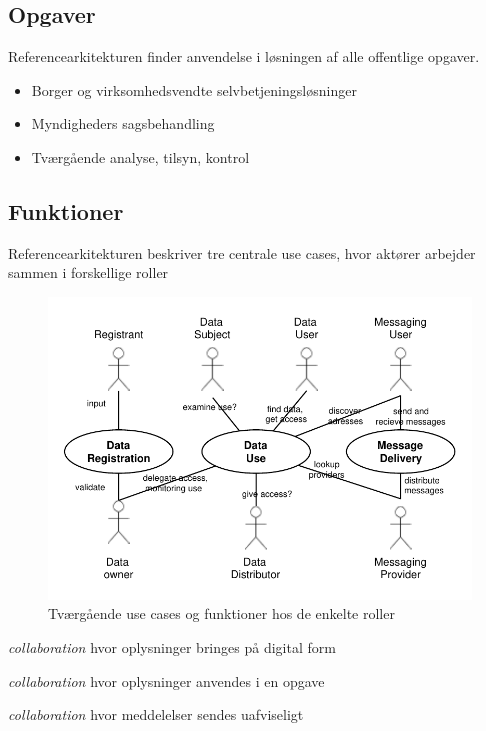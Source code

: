 \subsection{Opgaver}\label{opgaver}

Referencearkitekturen finder anvendelse i løsningen af alle offentlige
opgaver.

\begin{itemize}
\tightlist
\item
  Borger og virksomhedsvendte selvbetjeningsløsninger
\item
  Myndigheders sagsbehandling
\item
  Tværgående analyse, tilsyn, kontrol
\end{itemize}

\subsection{Funktioner}\label{funktioner}

Referencearkitekturen beskriver tre centrale use cases, hvor aktører
arbejder sammen i forskellige roller

\begin{figure}
\centering
\includegraphics{usecases.pdf}
\caption{Tværgående use cases og funktioner hos de enkelte roller}
\end{figure}

\begin{description}
\tightlist
\item[Registrering]
\emph{collaboration} hvor oplysninger bringes på digital form
\item[Datanvendelse]
\emph{collaboration} hvor oplysninger anvendes i en opgave
\item[Registreret forsendelse]
\emph{collaboration} hvor meddelelser sendes uafviseligt
\end{description}

